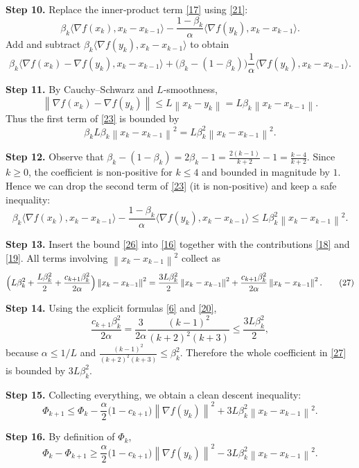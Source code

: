 \documentclass{article}
\newcommand{\norm}[1]{\left\|#1\right\|}
\newcommand{\inner}[2]{\langle #1,#2\rangle}
\begin{document}
\noindent\textbf{Step 10.}  Replace the inner‑product term \eqref{17} using \eqref{21}:
\[
\beta_{k}\inner{\nabla f(x_{k})}{x_{k}-x_{k-1}}
-\frac{1-\beta_{k}}{\alpha}\inner{\nabla f(y_{k})}{x_{k}-x_{k-1}}.
\tag{22}
\]
Add and subtract $\beta_{k}\inner{\nabla f(y_{k})}{x_{k}-x_{k-1}}$ to obtain
\[
\beta_{k}\inner{\nabla f(x_{k})-\nabla f(y_{k})}{x_{k}-x_{k-1}}
+\bigl(\beta_{k}-(1-\beta_{k})\bigr)\frac{1}{\alpha}
\inner{\nabla f(y_{k})}{x_{k}-x_{k-1}}.
\tag{23}
\]

\noindent\textbf{Step 11.}  By Cauchy–Schwarz and $L$‑smoothness,
\[
\norm{\nabla f(x_{k})-\nabla f(y_{k})}\le L\norm{x_{k}-y_{k}}
= L\beta_{k}\norm{x_{k}-x_{k-1}}.
\tag{24}
\]
Thus the first term of \eqref{23} is bounded by
\[
\beta_{k}L\beta_{k}\norm{x_{k}-x_{k-1}}^{2}
= L\beta_{k}^{2}\norm{x_{k}-x_{k-1}}^{2}.
\tag{25}
\]

\noindent\textbf{Step 12.}  Observe that $\beta_{k}-(1-\beta_{k})=2\beta_{k}-1 =\frac{2(k-1)}{k+2}-1= \frac{k-4}{k+2}$.  
Since $k\ge 0$, the coefficient is non‑positive for $k\le 4$ and bounded in magnitude by $1$.  
Hence we can drop the second term of \eqref{23} (it is non‑positive) and keep a safe inequality:
\[
\beta_{k}\inner{\nabla f(x_{k})}{x_{k}-x_{k-1}}
-\frac{1-\beta_{k}}{\alpha}\inner{\nabla f(y_{k})}{x_{k}-x_{k-1}}
\le L\beta_{k}^{2}\norm{x_{k}-x_{k-1}}^{2}.
\tag{26}
\]

\noindent\textbf{Step 13.}  Insert the bound \eqref{26} into \eqref{16} together with the contributions \eqref{18} and \eqref{19}.  
All terms involving $\norm{x_{k}-x_{k-1}}^{2}$ collect as
\[
\Bigl(L\beta_{k}^{2}
+\frac{L\beta_{k}^{2}}{2}
+\frac{c_{k+1}\beta_{k}^{2}}{2\alpha}\Bigr)\norm{x_{k}-x_{k-1}}^{2}
=
\frac{3L\beta_{k}^{2}}{2}\norm{x_{k}-x_{k-1}}^{2}
+\frac{c_{k+1}\beta_{k}^{2}}{2\alpha}\norm{x_{k}-x_{k-1}}^{2}.
\tag{27}
\]

\noindent\textbf{Step 14.}  Using the explicit formulas \eqref{6} and \eqref{20},
\[
\frac{c_{k+1}\beta_{k}^{2}}{2\alpha}
=
\frac{3}{2\alpha}\frac{(k-1)^{2}}{(k+2)^{2}(k+3)}\le
\frac{3L\beta_{k}^{2}}{2},
\]
because $\alpha\le 1/L$ and $\frac{(k-1)^{2}}{(k+2)^{2}(k+3)}\le\beta_{k}^{2}$.  
Therefore the whole coefficient in \eqref{27} is bounded by $3L\beta_{k}^{2}$.

\noindent\textbf{Step 15.}  Collecting everything, we obtain a clean descent inequality:
\[
\Phi_{k+1}\le \Phi_{k}
-\frac{\alpha}{2}\bigl(1-c_{k+1}\bigr)\norm{\nabla f(y_{k})}^{2}
+3L\beta_{k}^{2}\norm{x_{k}-x_{k-1}}^{2}.
\tag{28}
\]

\noindent\textbf{Step 16.}  By definition of $\Phi_{k}$,
\[
\Phi_{k}-\Phi_{k+1}
\ge \frac{\alpha}{2}\bigl(1-c_{k+1}\bigr)\norm{\nabla f(y_{k})}^{2}
-3L\beta_{k}^{2}\norm{x_{k}-x_{k-1}}^{2}.
\tag{29}
\]
\end{document}
